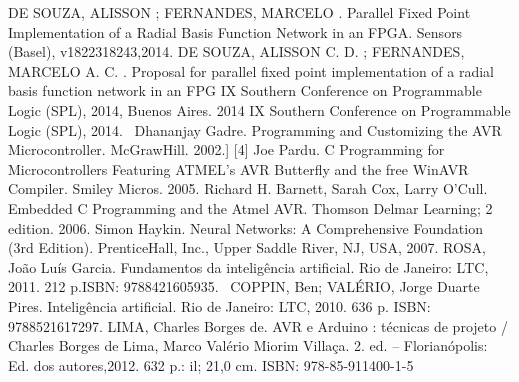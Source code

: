 \documentclass[
    12pt,               %
    oneside,%
    a4paper,            %
    english,            %
    french,             %
    spanish,            %
    brazil,             %
    ]{abntex2}
\begin{document}





\begin{thebibliography}{99}

 DE SOUZA, ALISSON ; FERNANDES, MARCELO . Parallel Fixed Point Implementation of a Radial Basis Function Network in an FPGA. Sensors (Basel), v18223­18243,2014.
 DE SOUZA, ALISSON C. D. ; FERNANDES, MARCELO A. C. . Proposal for parallel fixed point implementation of a radial basis function network in an FPG IX Southern Conference on Programmable Logic (SPL), 2014, Buenos Aires. 2014 IX Southern Conference on Programmable Logic (SPL), 2014. 
 Dhananjay Gadre. Programming and Customizing the AVR Microcontroller. McGraw­Hill. 2002.]
[4] Joe Pardu. C Programming for Microcontrollers Featuring ATMEL's AVR Butterfly and the free WinAVR Compiler. Smiley Micros. 2005.
  Richard H. Barnett, Sarah Cox, Larry O'Cull. Embedded C Programming and the Atmel AVR. Thomson Delmar Learning; 2 edition. 2006.
  Simon Haykin. Neural Networks: A Comprehensive Foundation (3rd Edition). Prentice­Hall, Inc., Upper Saddle River, NJ, USA, 2007.
 ROSA, João Luís Garcia. Fundamentos da inteligência artificial. Rio de Janeiro: LTC, 2011. 212 p.ISBN: 9788421605935. 
  COPPIN, Ben; VALÉRIO, Jorge Duarte Pires. Inteligência artificial. Rio de Janeiro: LTC, 2010. 636 p. ISBN: 9788521617297.
 LIMA, Charles Borges de. AVR e Arduino : técnicas de projeto / Charles Borges de Lima, Marco Valério Miorim Villaça. 2. ed. – Florianópolis: Ed. dos autores,2012. 632 p.: il; 21,0 cm. ISBN: 978-85-911400-1-5
\end{thebibliography}




%
%
\end{document}
